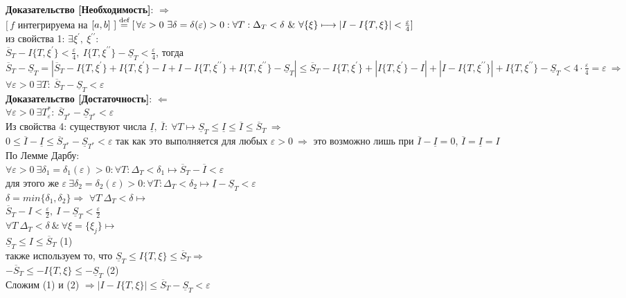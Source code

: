 \documentclass[a4paper,12pt]{article} %
\begin{document}
\textbf{Доказательство [Необходимость]}: $\Rightarrow$\\
$[\,f$ интегрируема на $[a,b]~] \stackrel{\text{def}}{=}[\,\forall\varepsilon>0~\exists\delta=\delta(\varepsilon)>0: \forall T:\\\Delta_{T}<\delta~\&~ \forall\{\xi\} \longmapsto|I-I\{T, \xi\}|<\frac{\varepsilon}{4}]\,$\\
из свойства 1: $\exists \xi^{\prime},~\xi^{\prime\prime}$:\\
$ \overline{S}_T - I\{T,\xi^{\prime}\}<\frac{\varepsilon}{4},~I\{T,\xi^{\prime\prime}\}-\underline{S}_T<\frac{\varepsilon}{4}$, тогда\\
$\overline{S}_T-\underline{S}_T=|\overline{S}_T-I\{T,\xi^{\prime}\}+I\{T,\xi^{\prime}\}-I+I-I\{T,\xi^{\prime\prime}\}+I\{T,\xi^{\prime\prime}\}-\underline{S}_T|\leq \overline{S}_T-I\{T,\xi^{\prime}\}+|I\{T,\xi^{\prime}\}-I|+|I-I\{T,\xi^{\prime\prime}\}|+I\{T,\xi^{\prime\prime}\}-\underline{S}_T<4\cdot \frac{\varepsilon}{4}=\varepsilon~\Rightarrow$\\
$\forall\varepsilon>0~\exists T:~\overline{S}_T-\underline{S}_T<\varepsilon$\\

\textbf{Доказательство [Достаточность]}: $\Leftarrow$\\
$\forall\varepsilon>0~\exists T^{*}_{\varepsilon}:~\overline{S}_{T^{*}}-\underline{S}_{T^{*}}<\varepsilon$\\
Из свойства 4: существуют числа $\underline{I},~\overline{I}:~\forall T\longmapsto \underline{S}_{T}\leq \underline{I}\leq \overline{I}\leq \overline{S}_{T}~\Rightarrow$\\
$0\leq \overline{I}-\underline{I}\leq \overline{S}_{T^{*}}-\underline{S}_{T^{*}}<\varepsilon$ так как это выполняется для любых $\varepsilon>0~\Rightarrow$ это возможно лишь при $\overline{I}-\underline{I}=0$, $\overline{I}=\underline{I}=I$\\
По Лемме Дарбу:\\
$\forall\varepsilon>0~\exists\delta_1 = \delta_{1}(\varepsilon)>0: \forall T:\Delta_{T}<\delta_1 \longmapsto \overline{S}_T-\overline{I}<\varepsilon$\\
для этого же $\varepsilon~\exists\delta_2 = \delta_{2}(\varepsilon)>0: \forall T:\Delta_{T}<\delta_2 \longmapsto \underline{I}-\underline{S}_T<\varepsilon$\\
$\delta=min\{\delta_1,\delta_2\}\Rightarrow$
$\forall T~\Delta_T<\delta \longmapsto$\\
$\overline{S}_T-I<\frac{\varepsilon}{2},~I-\underline{S}_T<\frac{\varepsilon}{2}$\\
$\forall T~\Delta_T<\delta~\&~\forall \xi=\{\xi_j\}\longmapsto$\\
$\underline{S}_T\leq I\leq \overline{S}_T$ (1)\\
также используем то, что $\underline{S}_T\leq I\{T,\xi\}\leq \overline{S}_T\Rightarrow$\\
$-\overline{S}_T\leq -I\{T,\xi\}\leq -\underline{S}_T$ (2)\\
Сложим (1) и (2) $\Rightarrow |I-I\{T,\xi\}|\leq \overline{S}_T-\underline{S}_T<\varepsilon$\\
\end{document}
